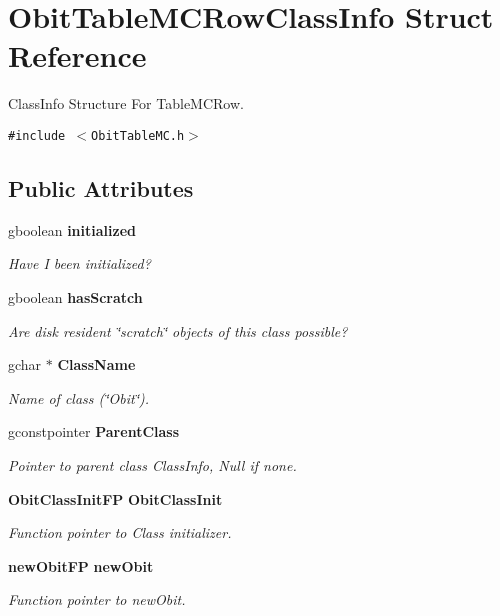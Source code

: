 \section{Obit\-Table\-MCRow\-Class\-Info Struct Reference}
\label{structObitTableMCRowClassInfo}
Class\-Info Structure For Table\-MCRow.  


{\tt \#include $<$Obit\-Table\-MC.h$>$}

\subsection*{Public Attributes}
\begin{CompactItemize}
\item 
gboolean {\bf initialized}
\begin{CompactList}\small\item\em Have I been initialized? \item\end{CompactList}\item 
gboolean {\bf has\-Scratch}
\begin{CompactList}\small\item\em Are disk resident \char`\"{}scratch\char`\"{} objects of this class possible? \item\end{CompactList}\item 
gchar $\ast$ {\bf Class\-Name}
\begin{CompactList}\small\item\em Name of class (\char`\"{}Obit\char`\"{}). \item\end{CompactList}\item 
gconstpointer {\bf Parent\-Class}
\begin{CompactList}\small\item\em Pointer to parent class Class\-Info, Null if none. \item\end{CompactList}\item 
{\bf Obit\-Class\-Init\-FP} {\bf Obit\-Class\-Init}
\begin{CompactList}\small\item\em Function pointer to Class initializer. \item\end{CompactList}\item 
{\bf new\-Obit\-FP} {\bf new\-Obit}
\begin{CompactList}\small\item\em Function pointer to new\-Obit. \item\end{CompactList}\item 

\end{CompactItemize}
